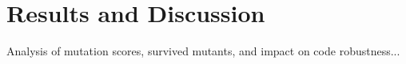 \chapter{Results and Discussion}
\label{chap:results}

Analysis of mutation scores, survived mutants, and impact on code robustness...

